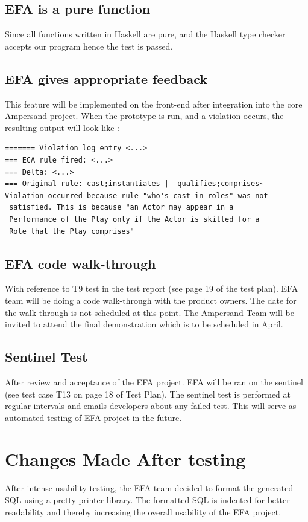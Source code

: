 \documentclass[12pt, svgnames]{article}
\begin{document}
\subsection{EFA is a pure function}
Since all functions written in
Haskell are pure, and the  Haskell type checker accepts our program hence the test is passed.

\subsection{EFA gives appropriate feedback}
This feature will be implemented on the front-end after integration into the core Ampersand project. When the prototype is run, and a violation occurs, the resulting output will look like :

\begin{verbatim}
======= Violation log entry <...>
=== ECA rule fired: <...> 
=== Delta: <...>
=== Original rule: cast;instantiates |- qualifies;comprises~
Violation occurred because rule "who's cast in roles" was not 
 satisfied. This is because "an Actor may appear in a 
 Performance of the Play only if the Actor is skilled for a 
 Role that the Play comprises"
\end{verbatim}

\subsection{EFA code walk-through}
With reference to T9 test in the test report (see page 19 of the test plan). EFA team will be doing a code walk-through with the product owners. The date for the walk-through is not scheduled at this point. The Ampersand Team will be invited to attend the final demonstration which is to be scheduled in April.

\subsection{Sentinel Test}
After review and acceptance of the EFA project. EFA will be ran on the sentinel (see test case T13 on page 18 of Test Plan). The sentinel test is performed at regular intervals and emails developers about any failed test. This will serve as automated testing of EFA project in the future.

\section{Changes Made After testing}
After intense usability testing, the EFA team decided to format the generated SQL using a pretty printer library. The formatted SQL is indented for better readability and thereby increasing the overall usability of the EFA project.



\end{document}
